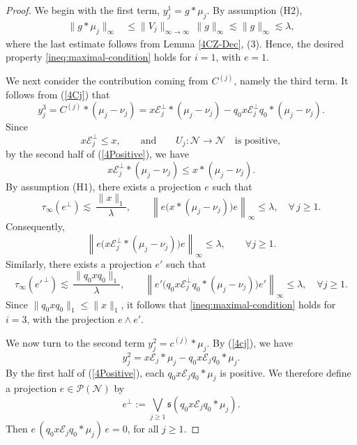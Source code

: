 \documentclass[12pt]{amsart}
\newcommand{\N}{\mbox{${\mathcal N}$}}
\renewcommand{\P}{\mbox{${\mathcal P}$}}
\theoremstyle{remark}
\theoremstyle{definition}
\numberwithin{equation}{section}
\begin{document}
\begin{proof}
We begin with the first term, $y_j^1=g*\mu_j$. 
By assumption (H2), 
\begin{align*}
\|g * \mu_j\|_\infty
&\le \|V_j\|_{\infty\to\infty}\,\|g\|_\infty \lesssim \|g\|_\infty \lesssim \lambda,
\end{align*}
where the last estimate follows from Lemma \ref{4CZ-Dec}, (3).
Hence, the desired property \eqref{ineq:maximal-condition} holds for $i=1$,
with $e=1$.





We next consider the contribution coming from $C^{(j)}$, namely the third term. 
It follows from (\ref{4Cj}) that
\[
y_j^3 = C^{(j)} * (\mu_j-\nu_j)
= x \mathcal{E}_j^{\perp} * (\mu_j-\nu_j)
- q_0 x\mathcal{E}_j^{\perp} q_0 * (\mu_j-\nu_j).
\]
Since
\[
x\mathcal{E}_j^{\perp} \leq x,
\qquad\text{and}\qquad
U_j\colon 
\N
\longrightarrow
\N
\quad \text{is positive},
\]
by the second half of (\ref{4Positive}),
we have
\[
x \mathcal{E}_j^{\perp} * (\mu_j-\nu_j)
\leq
x * (\mu_j-\nu_j).
\]
By assumption (H1), there exists a projection $e$ such that
\[
\tau_\infty(e^\perp)\lesssim\,\frac{\|x\|_1}{\lambda},\qquad
\left\|
e\bigl(x*(\mu_j-\nu_j)\bigr)e
\right\|_\infty\leq\lambda,\quad \forall\, j\ge1.\]
Consequently,
\[
\left\|e\bigl(x\mathcal{E}_j^{\perp}*(\mu_j-\nu_j)\bigr)e\right\|_\infty
\leq
\lambda,
\qquad \forall j\geq1.
\]
Similarly, there exists a projection $e'$ such that
\[
\tau_\infty(e'^{\,\perp})
\lesssim\,
\frac{\|q_0 x q_0\|_1}{\lambda},
\qquad
\left\|e'\bigl(q_0x\mathcal{E}_j^{\perp}q_0*(\mu_j-\nu_j)\bigr)e'
\right\|_\infty
\leq \lambda,
\quad \forall j\geq1.
\]
Since
\(\|q_0xq_0\|_1\leq \|x\|_1\),
it follows that \eqref{ineq:maximal-condition} holds for $i=3$,
with the projection $e\wedge e'$.










We now turn to the second term \(y_j^2 = c^{(j)} * \mu_j\). By
(\ref{4cj}), we have
\[
y_j^{2}
=x \mathcal{E}_j * \mu_j
- q_0 x\mathcal{E}_j q_0 * \mu_j.
\]
By the first half of (\ref{4Positive}), each
$q_0  x\mathcal{E}_j q_0 * \mu_j$ is positive. We therefore define a projection $e\in\P(\N)$ by
\[
e^\perp
:=
\bigvee_{j\ge 1}
{\mathfrak s}(q_0 x\mathcal{E}_j q_0 * \mu_j).
\]
Then
\(e\,
(q_0 x \mathcal{E}_j q_0 * \mu_j)\,e=0\),
for all $j \ge 1$. 





\end{proof}
\end{document}
